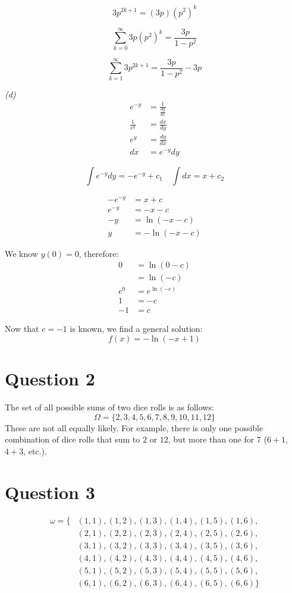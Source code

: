 \documentclass[titlepage, 12pt, leqno]{article}
\begin{document}
\[
    3p^{2k+1} = (3p)(p^2)^k
\]

\[
    \sum_{k=0}^{\infty}3p(p^2)^k = \frac{3p}{1-p^2} 
\]

\[
    \boxed{\sum_{k=1}^{\infty}3p^{2k+1} = \frac{3p}{1-p^2} - 3p} 
\]
\pagebreak

\textit{(d)} 
\begin{align*}
    e^{-y} &= \frac{1}{\frac{dy}{dx}} \\
    \frac{1}{e^y} &= \frac{dx}{dy} \\
    e^y &= \frac{dy}{dx} \\
    dx &= e^{-y}dy
\end{align*}

\[
    \int e^{-y}dy = -e^{-y} + c_1 \quad \int dx = x + c_2
\]

\begin{align*}
    -e^{-y} &= x + c \\
    e^{-y} &= -x - c \\
    -y &= \ln(-x-c) \\
    y &= -\ln(-x-c)
\end{align*}

We know $y(0) = 0$, therefore:
\begin{align*}
    0 &= \ln(0-c) \\
    &= \ln(-c) \\
    e^0 &= e^{\ln(-c)} \\
    1 &= -c \\
    -1 &= c
\end{align*}

Now that $c = -1$ is known, we find a general solution:
\[
    \boxed{f(x) = -\ln(-x+1)} 
\]
\pagebreak

\section{Question 2}
The set of all possible sums of two dice rolls is as follows:
\[
    \boxed{\Omega = \{2,3,4,5,6,7,8,9,10,11,12\}}
\]
These are not all equally likely. For example, there is only one possible combination of dice rolls that sum to $2$ or $12$, but more than one for $7$ ($6+1$, $4+3$, etc.).
\pagebreak

\section{Question 3}
\setlength{\jot}{5pt}
\begin{align*}
    \omega = \{&(1,1), (1,2), (1,3), (1,4), (1,5), (1,6), \\
           &(2,1), (2,2), (2,3), (2,4), (2,5), (2,6), \\
           &(3,1), (3,2), (3,3), (3,4), (3,5), (3,6), \\
           &(4,1), (4,2), (4,3), (4,4), (4,5), (4,6), \\
           &(5,1), (5,2), (5,3), (5,4), (5,5), (5,6), \\
           &(6,1), (6,2), (6,3), (6,4), (6,5), (6,6) \}
\end{align*}
\end{document}
